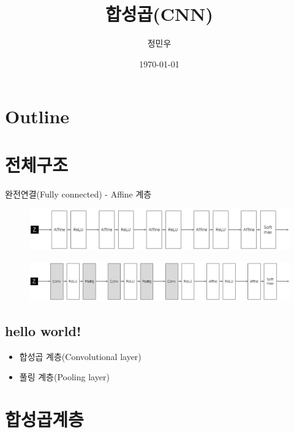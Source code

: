 \documentclass{beamer}
\begin{document}
\begin{frame}
	\title{합성곱(CNN)}
	\author{정민우}
	\date{\today}
	\titlepage
\end{frame}



\section*{Outline}
\begin{frame}
\tableofcontents
\end{frame}



\section{전체구조}
\begin{frame}
	완전연결(Fully connected) - Affine 계층
	\begin{figure}
		\includegraphics[width=1\columnwidth]{../Figure/Figure_1.pdf}
	\end{figure}
	\begin{figure}
		\includegraphics[width=1\columnwidth]{../Figure/Figure_2.pdf}
	\end{figure}	
\end{frame}

\subsection{hello world!}

\begin{frame}
	\begin{itemize}
		\item 합성곱 계층(Convolutional layer)
		\item 풀링 계층(Pooling layer)
	\end{itemize}
\end{frame}

\section{합성곱계층}
\end{document}
